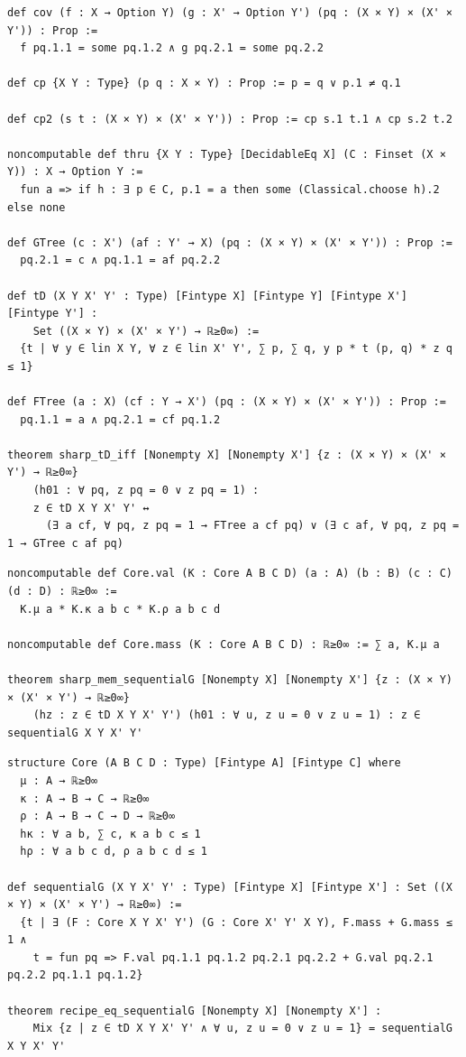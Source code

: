\label{lean:sharp-td-iff}
\begin{lstlisting}
def cov (f : X → Option Y) (g : X' → Option Y') (pq : (X × Y) × (X' × Y')) : Prop :=
  f pq.1.1 = some pq.1.2 ∧ g pq.2.1 = some pq.2.2

def cp {X Y : Type} (p q : X × Y) : Prop := p = q ∨ p.1 ≠ q.1

def cp2 (s t : (X × Y) × (X' × Y')) : Prop := cp s.1 t.1 ∧ cp s.2 t.2

noncomputable def thru {X Y : Type} [DecidableEq X] (C : Finset (X × Y)) : X → Option Y :=
  fun a => if h : ∃ p ∈ C, p.1 = a then some (Classical.choose h).2 else none

def GTree (c : X') (af : Y' → X) (pq : (X × Y) × (X' × Y')) : Prop :=
  pq.2.1 = c ∧ pq.1.1 = af pq.2.2

def tD (X Y X' Y' : Type) [Fintype X] [Fintype Y] [Fintype X'] [Fintype Y'] :
    Set ((X × Y) × (X' × Y') → ℝ≥0∞) :=
  {t | ∀ y ∈ lin X Y, ∀ z ∈ lin X' Y', ∑ p, ∑ q, y p * t (p, q) * z q ≤ 1}

def FTree (a : X) (cf : Y → X') (pq : (X × Y) × (X' × Y')) : Prop :=
  pq.1.1 = a ∧ pq.2.1 = cf pq.1.2

theorem sharp_tD_iff [Nonempty X] [Nonempty X'] {z : (X × Y) × (X' × Y') → ℝ≥0∞}
    (h01 : ∀ pq, z pq = 0 ∨ z pq = 1) :
    z ∈ tD X Y X' Y' ↔
      (∃ a cf, ∀ pq, z pq = 1 → FTree a cf pq) ∨ (∃ c af, ∀ pq, z pq = 1 → GTree c af pq)
\end{lstlisting}

\label{lean:sharp-mem-sequentialg}
\begin{lstlisting}
noncomputable def Core.val (K : Core A B C D) (a : A) (b : B) (c : C) (d : D) : ℝ≥0∞ :=
  K.μ a * K.κ a b c * K.ρ a b c d

noncomputable def Core.mass (K : Core A B C D) : ℝ≥0∞ := ∑ a, K.μ a

theorem sharp_mem_sequentialG [Nonempty X] [Nonempty X'] {z : (X × Y) × (X' × Y') → ℝ≥0∞}
    (hz : z ∈ tD X Y X' Y') (h01 : ∀ u, z u = 0 ∨ z u = 1) : z ∈ sequentialG X Y X' Y'
\end{lstlisting}

\label{lean:recipe-eq-sequentialg}
\begin{lstlisting}
structure Core (A B C D : Type) [Fintype A] [Fintype C] where
  μ : A → ℝ≥0∞
  κ : A → B → C → ℝ≥0∞
  ρ : A → B → C → D → ℝ≥0∞
  hκ : ∀ a b, ∑ c, κ a b c ≤ 1
  hρ : ∀ a b c d, ρ a b c d ≤ 1

def sequentialG (X Y X' Y' : Type) [Fintype X] [Fintype X'] : Set ((X × Y) × (X' × Y') → ℝ≥0∞) :=
  {t | ∃ (F : Core X Y X' Y') (G : Core X' Y' X Y), F.mass + G.mass ≤ 1 ∧
    t = fun pq => F.val pq.1.1 pq.1.2 pq.2.1 pq.2.2 + G.val pq.2.1 pq.2.2 pq.1.1 pq.1.2}

theorem recipe_eq_sequentialG [Nonempty X] [Nonempty X'] :
    Mix {z | z ∈ tD X Y X' Y' ∧ ∀ u, z u = 0 ∨ z u = 1} = sequentialG X Y X' Y'
\end{lstlisting}

